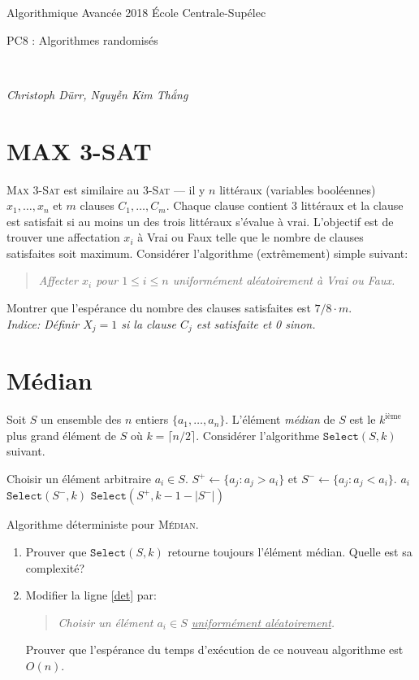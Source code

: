 \documentclass[12pt]{article}
\newcommand{\MakeScribeTop}[1]{
\noindent
\begin{framed}
\noindent
 Algorithmique Avancée 2018
 \hfill
 École Centrale-Supélec
 \\[1em]
 \centerline{ \Large
#1
 }
 \\[1em]
\centerline{  \it Christoph Dürr, Nguyễn Kim Thắng}
\end{framed}
}
\begin{document}
    \MakeScribeTop{PC8 : Algorithmes randomisés}



\section{MAX 3-SAT}

\textsc{Max 3-Sat} est similaire au \textsc{3-Sat} --- il y $n$ littéraux (variables booléennes) $x_{1}, \ldots, x_{n}$
et $m$ clauses $C_{1}, \ldots, C_{m}$. Chaque clause contient 3 littéraux et la clause est satisfait si au moins un des trois littéraux
s'évalue à vrai. L'objectif est de trouver une affectation $x_{i}$ à \textsf{Vrai} ou \textsf{Faux} telle que le nombre de clauses 
satisfaites soit maximum.
Considérer l'algorithme (extrêmement) simple suivant:

\begin{quote}
	\em Affecter $x_{i}$ pour $1 \leq i \leq n$ uniformément aléatoirement à \textsf{Vrai} ou \textsf{Faux}. 
\end{quote} 

Montrer que l'espérance du nombre des clauses satisfaites est $7/8 \cdot m$.\\
\emph{Indice: Définir $X_{j} = 1$ si la clause $C_{j}$ est satisfaite et 0 sinon.}

\section{Médian}

Soit $S$ un ensemble des $n$ entiers $\{a_{1}, \ldots, a_{n}\}$.
L'élément \emph{médian} de $S$ est le $k^{\text{ième}}$ plus grand élément de $S$
où $k = \lceil n/2 \rceil$. Considérer l'algorithme $\texttt{Select}(S,k)$ suivant.

\begin{algorithm}[ht]
\begin{algorithmic}[1]  
\STATE Choisir un élément arbitraire $a_{i} \in S$.	\label{det}
\STATE $S^{+} \gets \{a_{j}: a_{j} > a_{i}\}$ et $S^{-} \gets \{a_{j}: a_{j} < a_{i}\}$.
	\RETURN $a_{i}$
\ELSE
		\RETURN $\texttt{Select}(S^{-},k)$
		\RETURN $\texttt{Select}(S^{+},k - 1 - |S^{-}|)$
	\ENDIF
\ENDIF
\end{algorithmic}
\caption{Algorithme déterministe pour \textsc{Médian}.}
\label{algo:median}
\end{algorithm}

\begin{enumerate}
	\item Prouver que $\texttt{Select}(S,k)$ retourne toujours l'élément médian. Quelle est sa complexité?
	\item Modifier la ligne \ref{det} par:
		\begin{quote}
			\em  Choisir un élément $a_{i} \in S$ \underline{uniformément aléatoirement}.
		\end{quote} 
		Prouver que l'espérance du temps d'exécution de ce nouveau algorithme est $O(n)$. 
\end{enumerate}
\end{document}
